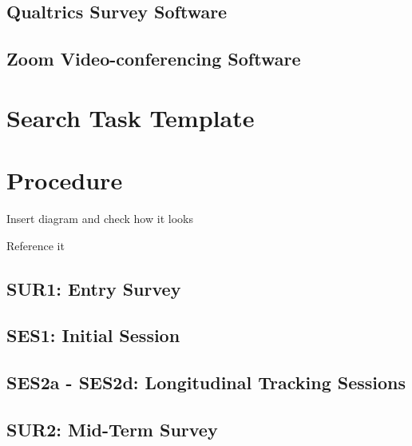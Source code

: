 \documentclass[a4paper, nobind]{templates/ociamthesis}
\begin{document}
\hypertarget{qualtrics-survey-software}{%
\subsection{Qualtrics Survey Software}\label{qualtrics-survey-software}}

\hypertarget{zoom-video-conferencing-software}{%
\subsection{Zoom Video-conferencing Software}\label{zoom-video-conferencing-software}}

\hypertarget{sec_method_search_task_template}{%
\section{Search Task Template}\label{sec_method_search_task_template}}

\hypertarget{sec_method_procedure}{%
\section{Procedure}\label{sec_method_procedure}}

Insert diagram and check how it looks

Reference it

\hypertarget{sec_method_sur1}{%
\subsection{SUR1: Entry Survey}\label{sec_method_sur1}}

\hypertarget{ses1-initial-session}{%
\subsection{SES1: Initial Session}\label{ses1-initial-session}}

\hypertarget{ses2a---ses2d-longitudinal-tracking-sessions}{%
\subsection{SES2a - SES2d: Longitudinal Tracking Sessions}\label{ses2a---ses2d-longitudinal-tracking-sessions}}

\hypertarget{sec_method_sur2}{%
\subsection{SUR2: Mid-Term Survey}\label{sec_method_sur2}}
\end{document}
